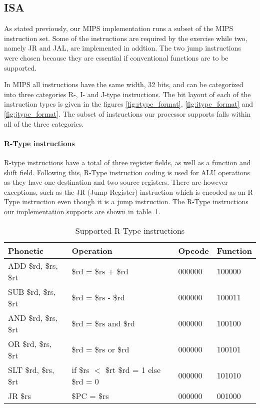 \subsection{ISA}
\label{sec:isa}
As stated previously, our MIPS implementation runs a subset of the MIPS instruction set. Some of the instructions are required by the exercise while two, namely JR and JAL, are implemented in addtion. The two jump instructions were chosen because they are essential if conventional functions are to be supported.

In MIPS all instructions have the same width, 32 bits, and can be categorized into three categories R-, I- and J-type instructions. The bit layout of each of the instruction types is given in the figures \ref{fig:rtype_format}, \ref{fig:itype_format} and \ref{fig:jtype_format}. The subset of instructions our processor supports falls within all of the three categories. 

\paragraph{R-Type instructions}
R-type instructions have a total of three register fields, as well as a function and shift field. Following this, R-Type instruction coding is used for ALU operations as they have one destination and two source registers. There are however exceptions, such as the JR (Jump Register) instruction which is encoded as an R-Type instruction even though it is a jump instruction. The R-Type instructions our implementation supports are shown in table~\ref{table:rtype_instructions}.


\begin{table}[h]
    \begin{tabular}{l|l|l|l}
    Phonetic & Operation & Opcode & Function \\

    \hline
    ADD \$rd, \$rs, \$rt & \$rd = \$rs + \$rd   & 000000 & 100000 \\
    SUB \$rd, \$rs, \$rt & \$rd = \$rs - \$rd   & 000000 & 100011 \\ 
    AND \$rd, \$rs, \$rt & \$rd = \$rs and \$rd & 000000 & 100100 \\ 
    OR  \$rd, \$rs, \$rt & \$rd = \$rs or \$rd  & 000000 & 100101 \\  
    SLT \$rd, \$rs, \$rt & if \$rs $<$ \$rt \$rd = 1 else \$rd = 0  & 000000 & 101010 \\ 
    JR  \$rs             & \$PC = \$rs          & 000000 & 001000 \\ 
    \hline
    \end{tabular}

    \caption{Supported R-Type instructions}
    \label{table:rtype_instructions}
\end{table}

